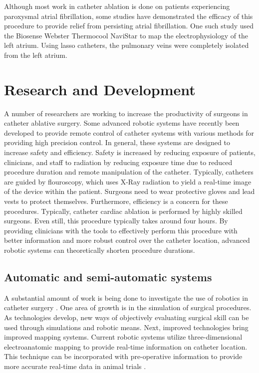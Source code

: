 \documentclass[letterpaper,10pt,conference]{ieeeconf}   %
\begin{document}
Although most work in catheter ablation is done on patients experiencing paroxysmal atrial fibrillation, some studies have demonstrated the efficacy of this procedure to provide relief from persisting atrial fibrillation. One such study \cite{ouyang:05a} used the Biosense Webster Thermocool NaviStar to map the electrophysiology of the left atrium. Using lasso catheters, the pulmonary veins were completely isolated from the left atrium. 

\section{Research and Development}
\label{sec:research}

A number of researchers are working to increase the productivity of surgeons in catheter ablative surgery. Some advanced robotic systems have recently been developed to provide remote control of catheter systems with various methods for providing high precision control. In general, these systems are designed to increase safety and efficiency. Safety is increased by reducing exposure of patients, clinicians, and staff to radiation by reducing exposure time due to reduced procedure duration and remote manipulation of the catheter. Typically, catheters are guided by flouroscopy, which uses X-Ray radiation to yield a real-time image of the device within the patient. Surgeons need to wear protective gloves and lead vests to protect themselves. Furthermore, efficiency is a concern for these procedures. Typically, catheter cardiac ablation is performed by highly skilled surgeons. Even still, this procedure typically takes around four hours. By providing clinicians with the tools to effectively perform this procedure with better information and more robust control over the catheter location, advanced robotic systems can theoretically shorten procedure durations.

\subsection{Automatic and semi-automatic systems}
\label{sec:autosemiauto}

A substantial amount of work is being done to investigate the use of robotics in catheter surgery \cite{rafii2014current}. One area of growth is in the simulation of surgical procedures. As technologies develop, new ways of objectively evaluating surgical skill can be used through simulations and robotic means. Next, improved technologies bring improved mapping systems. Current robotic systems utilize three-dimensional electroanatomic mapping to provide real-time information on catheter location. This technique can be incorporated with pre-operative information to provide more accurate real-time data in animal trials \cite{reddy:07a}.
\end{document}
